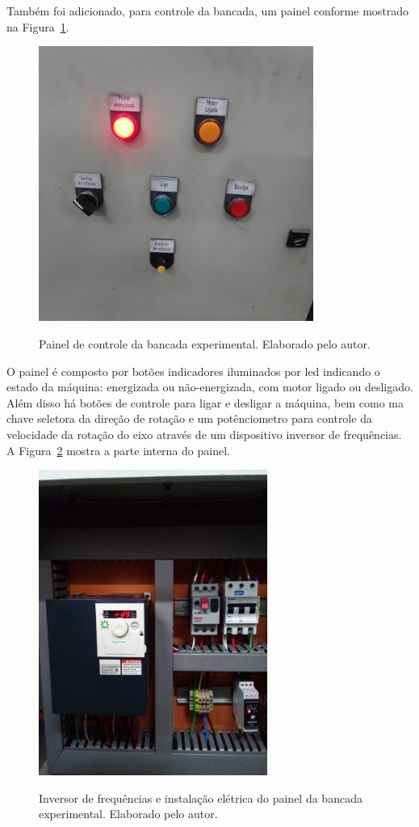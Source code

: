 \documentclass[
	12pt,				
	oneside,			
	a4paper,			
	english,			
	brazil,			
	]{abntex2ppgsi}
\begin{document}
Também foi adicionado, para controle da bancada, um painel conforme mostrado na Figura~\ref{painel_bancada}. 

\begin{figure}[H]
\centering
\caption {Painel de controle da bancada experimental. Elaborado pelo autor.}
\includegraphics[width=\textwidth,height=90mm,keepaspectratio]{painel_bancada}
\label{painel_bancada}
\end{figure}
 
O painel é composto por botões indicadores iluminados por led indicando o estado da máquina: energizada ou não-energizada, com motor ligado ou desligado. Além disso há botões de controle para ligar e desligar a máquina, bem como ma chave seletora da direção de rotação e um potênciometro para controle da velocidade da rotação do eixo através de um dispositivo inversor de frequências. A Figura~\ref{painel_por_dentro} mostra a parte interna do painel.
 
\begin{figure}[H]
\centering
\caption {Inversor de frequências e instalação elétrica do painel da bancada experimental. Elaborado pelo autor.}
\includegraphics[width=\textwidth,height=100mm,keepaspectratio]{painel_por_dentro}
\label{painel_por_dentro}
\end{figure}
\end{document}
